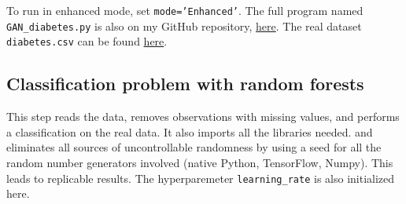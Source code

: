 \documentclass[oneside,10pt]{book}
\begin{document}
To run in enhanced mode, set \texttt{mode='Enhanced'}. The full program named \texttt{GAN\_diabetes.py}
 is also on my GitHub repository,
 \href{https://github.com/VincentGranville/Main/blob/main/GAN_diabetes.py}{here}. The real dataset
 \texttt{diabetes.csv} can be found \href{https://github.com/VincentGranville/Main/blob/main/diabetes.csv}{here}.


\subsection{Classification problem with random forests}\label{cfpadgfvew}

This step reads the data, removes observations with missing values, and performs a classification on the real data. It also imports all the libraries needed.
 and eliminates all sources of uncontrollable randomness by using a seed for all the random number generators involved (native Python,
 TensorFlow, Numpy). This leads to replicable results. The hyperparemeter \texttt{learning\_rate} is also initialized here.\vspace{1ex}
\end{document}
